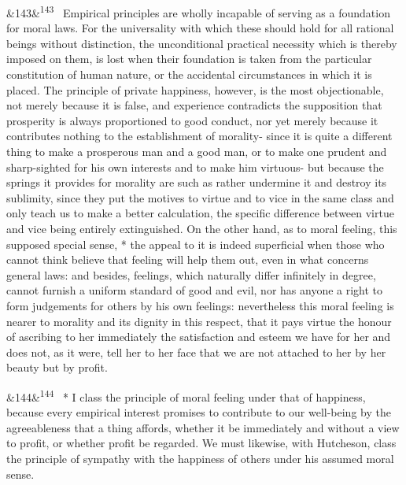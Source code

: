 \documentclass[12pt]{article}
\newcommand{\para}[1][]{\par\noindent\ifx&#1&\else\textsuperscript{\footnotesize #1}~\fi}
\begin{document}
\para[143] Empirical principles are wholly incapable of serving as a foundation for moral laws. For the universality with which these should hold for all rational beings without distinction, the unconditional practical necessity which is thereby imposed on them, is lost when their foundation is taken from the particular constitution of human nature, or the accidental circumstances in which it is placed. The principle of private happiness, however, is the most objectionable, not merely because it is false, and experience contradicts the supposition that prosperity is always proportioned to good conduct, nor yet merely because it contributes nothing to the establishment of morality- since it is quite a different thing to make a prosperous man and a good man, or to make one prudent and sharp-sighted for his own interests and to make him virtuous- but because the springs it provides for morality are such as rather undermine it and destroy its sublimity, since they put the motives to virtue and to vice in the same class and only teach us to make a better calculation, the specific difference between virtue and vice being entirely extinguished. On the other hand, as to moral feeling, this supposed special sense, * the appeal to it is indeed superficial when those who cannot think believe that feeling will help them out, even in what concerns general laws: and besides, feelings, which naturally differ infinitely in degree, cannot furnish a uniform standard of good and evil, nor has anyone a right to form judgements for others by his own feelings: nevertheless this moral feeling is nearer to morality and its dignity in this respect, that it pays virtue the honour of ascribing to her immediately the satisfaction and esteem we have for her and does not, as it were, tell her to her face that we are not attached to her by her beauty but by profit.

\para[144] * I class the principle of moral feeling under that of happiness, because every empirical interest promises to contribute to our well-being by the agreeableness that a thing affords, whether it be immediately and without a view to profit, or whether profit be regarded. We must likewise, with Hutcheson, class the principle of sympathy with the happiness of others under his assumed moral sense.
\end{document}

